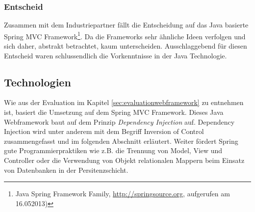\subsubsection*{Entscheid}
Zusammen mit dem Industriepartner fällt die Entscheidung auf das Java basierte Spring MVC Framework\footnote{Java Spring Framework Family, \url{http://springsource.org}, aufgerufen am 16.052013)}. Da die Frameworks sehr ähnliche Ideen verfolgen und sich daher, abstrakt betrachtet, kaum unterscheiden. Ausschlaggebend für diesen Entscheid waren schlussendlich die Vorkenntnisse in der Java Technologie. 

\subsection{Technologien}
Wie aus der Evaluation im Kapitel \ref{sec:evaluationwebframework} zu entnehmen ist, basiert die Umsetzung auf dem Spring MVC Framework. Dieses Java Webframework baut auf dem Prinzip \textit{Dependency Injection} auf. Dependency Injection wird unter anderem mit dem Begriff Inversion of Control zusammengefasst und im folgenden Abschnitt erläutert. Weiter fördert Spring gute Programmierpraktiken wie z.B. die Trennung von Model, View und Controller oder die Verwendung von Objekt relationalen Mappern beim Einsatz von Datenbanken in der Persitenzschicht.

